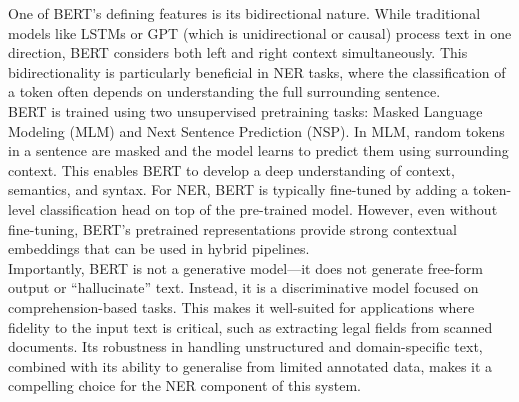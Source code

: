 \documentclass{article}
\begin{document}
One of BERT’s defining features is its bidirectional nature. While traditional models like LSTMs or GPT (which is unidirectional or causal) process text in one direction, BERT considers both left and right context simultaneously. This bidirectionality is particularly beneficial in NER tasks, where the classification of a token often depends on understanding the full surrounding sentence. \\

BERT is trained using two unsupervised pretraining tasks: Masked Language Modeling (MLM) and Next Sentence Prediction (NSP). In MLM, random tokens in a sentence are masked and the model learns to predict them using surrounding context. This enables BERT to develop a deep understanding of context, semantics, and syntax. For NER, BERT is typically fine-tuned by adding a token-level classification head on top of the pre-trained model. However, even without fine-tuning, BERT’s pretrained representations provide strong contextual embeddings that can be used in hybrid pipelines. \\

Importantly, BERT is not a generative model—it does not generate free-form output or “hallucinate” text. Instead, it is a discriminative model focused on comprehension-based tasks. This makes it well-suited for applications where fidelity to the input text is critical, such as extracting legal fields from scanned documents. Its robustness in handling unstructured and domain-specific text, combined with its ability to generalise from limited annotated data, makes it a compelling choice for the NER component of this system.
\end{document}

